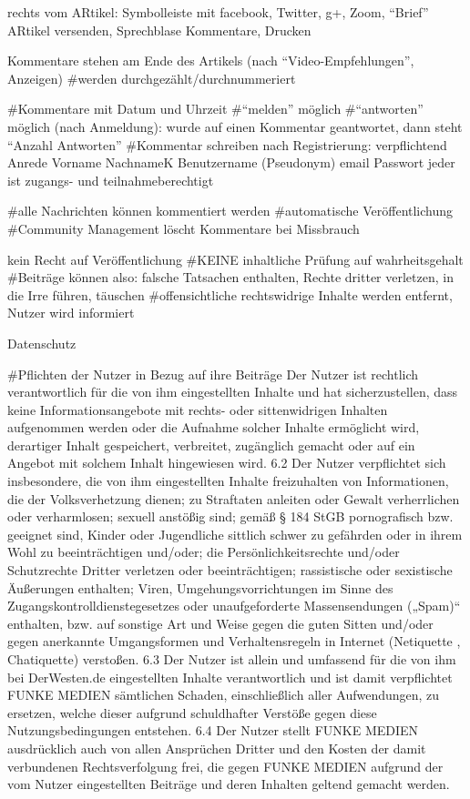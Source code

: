 rechts vom ARtikel: Symbolleiste mit facebook, Twitter, g+, Zoom, ``Brief'' ARtikel versenden, Sprechblase Kommentare, Drucken

Kommentare stehen am Ende des Artikels (nach ``Video-Empfehlungen'', Anzeigen)
#werden durchgezählt/durchnummeriert



#Kommentare mit Datum und Uhrzeit
#``melden'' möglich
#``antworten'' möglich (nach Anmeldung): wurde auf einen Kommentar geantwortet, dann steht ``Anzahl Antworten''
#Kommentar schreiben nach Registrierung:
	verpflichtend
	Anrede
	Vorname
	NachnameK
	Benutzername (Pseudonym)
	email
	Passwort
	jeder ist zugangs- und teilnahmeberechtigt
	

#alle Nachrichten können kommentiert werden 
#automatische Veröffentlichung
#Community Management löscht Kommentare bei Missbrauch

kein Recht auf Veröffentlichung
#KEINE inhaltliche Prüfung auf wahrheitsgehalt
#Beiträge können also: falsche Tatsachen enthalten, Rechte dritter verletzen, in die Irre führen, täuschen 
#offensichtliche rechtswidrige Inhalte werden entfernt, Nutzer wird informiert

Datenschutz

#Pflichten der Nutzer in Bezug auf ihre Beiträge
Der Nutzer ist rechtlich verantwortlich für die von ihm eingestellten Inhalte und hat sicherzustellen, dass keine Informationsangebote mit rechts- oder sittenwidrigen Inhalten aufgenommen werden oder die Aufnahme solcher Inhalte ermöglicht wird, derartiger Inhalt gespeichert, verbreitet, zugänglich gemacht oder auf ein Angebot mit solchem Inhalt hingewiesen wird.
6.2 Der Nutzer verpflichtet sich insbesondere, die von ihm eingestellten Inhalte freizuhalten von Informationen, die der Volksverhetzung dienen; zu Straftaten anleiten oder Gewalt verherrlichen oder verharmlosen; sexuell anstößig sind; gemäß § 184 StGB pornografisch bzw. geeignet sind, Kinder oder Jugendliche sittlich schwer zu gefährden oder in ihrem Wohl zu beeinträchtigen und/oder; die Persönlichkeitsrechte und/oder Schutzrechte Dritter verletzen oder beeinträchtigen; rassistische oder sexistische Äußerungen enthalten; Viren, Umgehungsvorrichtungen im Sinne des Zugangskontrolldienstegesetzes oder unaufgeforderte Massensendungen („Spam)“ enthalten, bzw. auf sonstige Art und Weise gegen die guten Sitten und/oder gegen anerkannte Umgangsformen und Verhaltensregeln in Internet (Netiquette , Chatiquette) verstoßen.
6.3 Der Nutzer  ist allein und umfassend für die von ihm bei DerWesten.de eingestellten Inhalte verantwortlich und ist damit verpflichtet FUNKE MEDIEN sämtlichen Schaden, einschließlich aller Aufwendungen, zu ersetzen, welche dieser aufgrund schuldhafter Verstöße gegen diese Nutzungsbedingungen entstehen.
6.4 Der Nutzer stellt FUNKE MEDIEN ausdrücklich auch von allen Ansprüchen Dritter und den Kosten der damit verbundenen Rechtsverfolgung frei, die gegen FUNKE MEDIEN aufgrund der vom Nutzer eingestellten Beiträge und deren Inhalten geltend gemacht werden.

